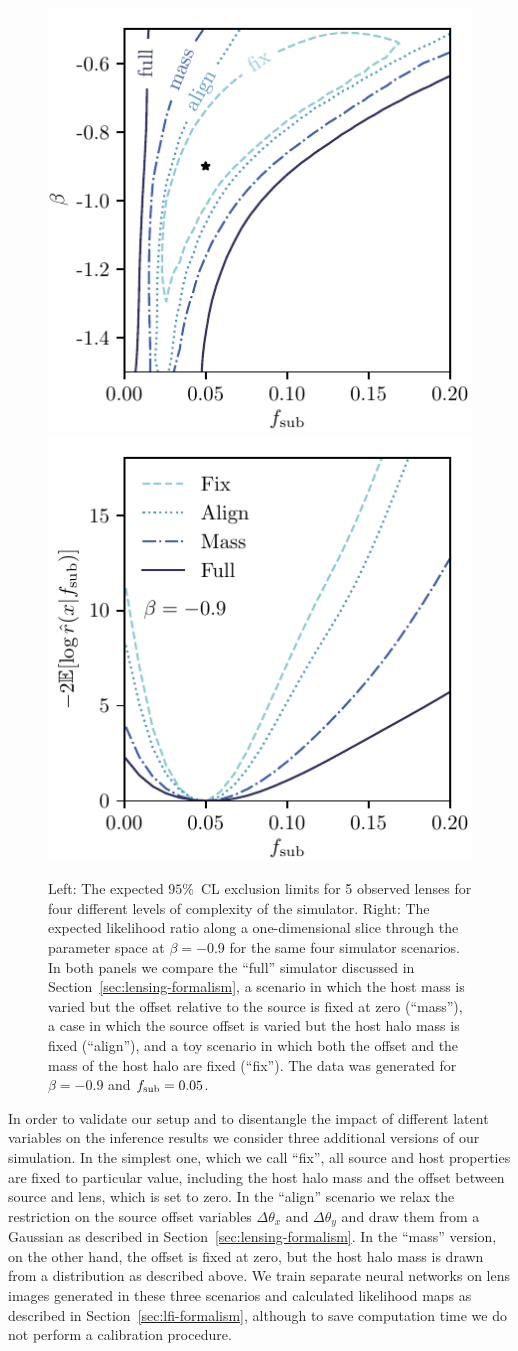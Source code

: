 \documentclass[twocolumn]{aastex63}
\begin{document}
\begin{figure}
\centering
\includegraphics[height=0.4\textwidth]{figures/scenarios_2d}%
\hspace*{0.052\textwidth}\hspace*{0.075\textwidth}%
\includegraphics[height=0.4\textwidth]{figures/scenarios_1d}%
\hspace*{0.052\textwidth}%
\caption{Left: The expected $95\%$~CL exclusion limits for 5 observed lenses for four different levels of complexity of the simulator. Right: The expected likelihood ratio along a one-dimensional slice through the parameter space at $\beta = -0.9$ for the same four simulator scenarios. In both panels we compare the ``full'' simulator discussed in Section~\ref{sec:lensing-formalism}, a scenario in which the host mass is varied but the offset relative to the source is fixed at zero (``mass''), a case in which the source offset is varied but the host halo mass is fixed (``align''), and a toy scenario in which both the offset and the mass of the host halo are fixed (``fix''). The data was generated for $\beta = -0.9$ and $f_{\mathrm{sub}} = 0.05$. }
\label{fig:scenarios}
\end{figure}

In order to validate our setup and to disentangle the impact of different latent variables on the inference results we consider three additional versions of our simulation. In the simplest one, which we call ``fix'', all source and host properties are fixed to particular value, including the host halo mass and the offset between source and lens, which is set to zero. In the ``align'' scenario we relax the restriction on the source offset variables $\Delta\theta_x$ and $\Delta\theta_y$ and draw them from a Gaussian as described in Section~\ref{sec:lensing-formalism}. In the ``mass'' version, on the other hand, the offset is fixed at zero, but the host halo mass is drawn from a distribution as described above. We train separate neural networks on lens images generated in these three scenarios and calculated likelihood maps as described in Section~\ref{sec:lfi-formalism}, although to save computation time we do not perform a calibration procedure.
\end{document}

